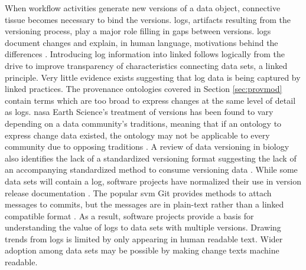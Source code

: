 When workflow activities generate new \glspl{version} of a data object, connective tissue becomes necessary to bind the \glspl{version}.
\Glspl{log}, artifacts resulting from the versioning process, play a major role filling in gaps between versions.
\Glspl{log} document changes and explain, in human language, motivations behind the differences \cite{uel1037}.
Introducing \gls{log} information into \gls{linked} follows logically from the drive to improve transparency of characteristics connecting data sets, a \gls{linked} principle.
Very little evidence exists suggesting that \gls{log} data is being captured by \gls{linked} practices.
The provenance ontologies covered in Section \ref{sec:provmod} contain terms which are too broad to express changes at the same level of detail as \glspl{log}.
\gls{nasa} Earth Science's treatment of versions has been found to vary depending on a data community's traditions, meaning that if an ontology to express change data existed, the ontology may not be applicable to every community due to opposing traditions \cite{barkstrom2014earth}.
A review of data versioning in biology also identifies the lack of a standardized versioning format suggesting the lack of an accompanying standardized method to consume versioning data \cite{Tagger2005}.
While some data sets will contain a \gls{log}, software projects have normalized their use in version release documentation \cite{German03automatingthe}.
The popular \gls{svm} Git provides methods to attach messages to commits, but the messages are in plain-text rather than a \gls{linked} compatible format \cite{Chacon:2009:PG:1618548}.
As a result, software projects provide a basis for understanding the value of \glspl{log} to data sets with multiple \glspl{version}.
Drawing trends from \gls{log}s is limited by only appearing in human readable text.
Wider adoption among data sets may be possible by making change texts machine readable.

